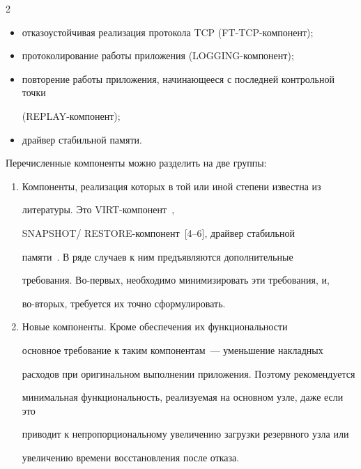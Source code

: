 \begin{multicols}{2}
\begin{itemize}
(SNAPSHOT/RESTORE-ком\-по\-нент);

\item отказоустойчивая реализация протокола TCP (FT-TCP-компонент);

\item протоколирование работы приложения (LOGGING-компонент);

\item повторение работы приложения, начинающееся с последней контрольной точки

(REPLAY-компонент);

\item драйвер стабильной памяти.

\end{itemize}



Перечисленные компоненты можно разделить на две группы:

\begin{enumerate}[1.]

\item Компоненты, реализация которых в той или иной степени известна из

литературы. Это VIRT-компонент~\cite{10zak, 11zak},

SNAPSHOT/ RESTORE-компонент~[4--6], драйвер стабильной

памяти~\cite{12zak}. В ряде случаев к ним предъявляются дополнительные

требования. Во-первых, необходимо минимизировать эти требования, и,

во-вторых, требуется их точно сформулировать.

\item Новые компоненты. Кроме обеспечения их функциональности

основное требование к таким компонентам~--- уменьшение накладных

расходов при оригинальном выполнении приложения. Поэтому рекомендуется

минимальная функциональность, реа\-ли\-зу\-емая на основном узле, даже если это

приводит к непропорциональному увеличению загрузки резервного узла или

увеличению времени восстановления после отказа.

\end{enumerate}



\vspace*{-6pt}


\end{multicols}
